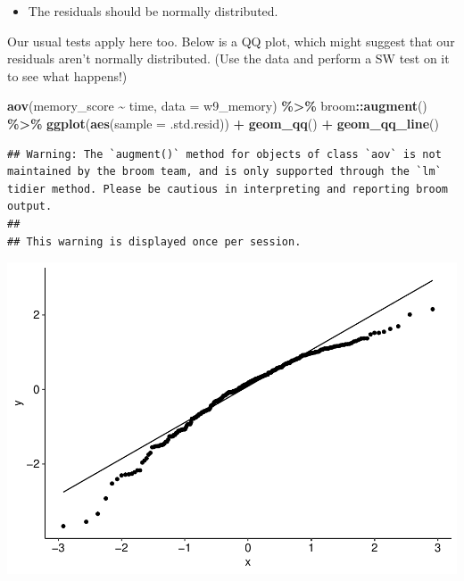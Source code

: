 \documentclass[
]{book}
\newenvironment{Shaded}{\begin{snugshade}}{\end{snugshade}}
\newcommand{\AttributeTok}[1]{\textcolor[rgb]{0.13,0.29,0.53}{#1}}
\newcommand{\FunctionTok}[1]{\textcolor[rgb]{0.13,0.29,0.53}{\textbf{#1}}}
\newcommand{\NormalTok}[1]{#1}
\newcommand{\SpecialCharTok}[1]{\textcolor[rgb]{0.81,0.36,0.00}{\textbf{#1}}}
\providecommand{\tightlist}{%
  \setlength{\itemsep}{0pt}\setlength{\parskip}{0pt}}
\begin{document}
\begin{itemize}
\tightlist
\item
  The residuals should be normally distributed.
\end{itemize}

Our usual tests apply here too. Below is a QQ plot, which might suggest that our residuals aren't normally distributed. (Use the data and perform a SW test on it to see what happens!)

\begin{Shaded}
\begin{Highlighting}[]
\FunctionTok{aov}\NormalTok{(memory\_score }\SpecialCharTok{\textasciitilde{}}\NormalTok{ time, }\AttributeTok{data =}\NormalTok{ w9\_memory) }\SpecialCharTok{\%\textgreater{}\%}
\NormalTok{  broom}\SpecialCharTok{::}\FunctionTok{augment}\NormalTok{() }\SpecialCharTok{\%\textgreater{}\%}
  \FunctionTok{ggplot}\NormalTok{(}\FunctionTok{aes}\NormalTok{(}\AttributeTok{sample =}\NormalTok{ .std.resid)) }\SpecialCharTok{+}
  \FunctionTok{geom\_qq}\NormalTok{() }\SpecialCharTok{+}
  \FunctionTok{geom\_qq\_line}\NormalTok{()}
\end{Highlighting}
\end{Shaded}

\begin{verbatim}
## Warning: The `augment()` method for objects of class `aov` is not maintained by the broom team, and is only supported through the `lm` tidier method. Please be cautious in interpreting and reporting broom output.
## 
## This warning is displayed once per session.
\end{verbatim}

\includegraphics{_main_files/figure-latex/unnamed-chunk-174-1.pdf}
\end{document}
